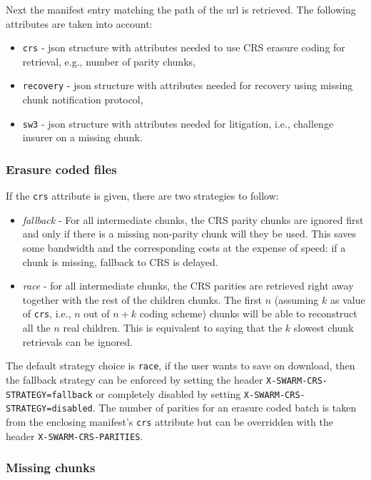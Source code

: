 Next the manifest entry matching the path of the url is retrieved. The following attributes are taken into account:

\begin{itemize}
    \item \texttt{crs} - {json structure with attributes needed to use CRS erasure coding for retrieval, e.g., number of parity chunks},
    \item \texttt{recovery} - {json structure with attributes needed for recovery using missing chunk notification protocol},
    \item \texttt{sw3} - {json structure with attributes needed for litigation, i.e., challenge insurer on a missing chunk}. 
\end{itemize}


\subsubsection{Erasure coded files}

If the \texttt{crs} attribute is given, there are two strategies to follow: 

\begin{itemize}
\item \emph{fallback} - For all intermediate chunks, the CRS parity chunks are ignored first and only if there is a missing non-parity chunk will they be used. This saves some bandwidth and the corresponding costs at the expense of speed: if a chunk is missing, fallback to CRS is delayed.
\item \emph{race} - for all intermediate chunks, the CRS parities are retrieved right away together with the rest of the children chunks. The first $n$ (assuming $k$ as value of \texttt{crs}, i.e., $n$ out of $n+k$ coding scheme) chunks will be able to reconstruct all the $n$ real children. This is equivalent to saying that the $k$ slowest chunk retrievals can be ignored.  
\end{itemize}

The default strategy choice is \texttt{race}, if the user wants to save on download, then the fallback strategy can be enforced by setting the header \texttt{X-SWARM-CRS-STRATEGY=fallback} or completely disabled by setting \texttt{X-SWARM-CRS-STRATEGY=disabled}. The number of parities for an erasure coded batch is taken from the enclosing manifest's \texttt{crs} attribute but can be overridden with the header \texttt{X-SWARM-CRS-PARITIES}.

\subsubsection{Missing chunks}


